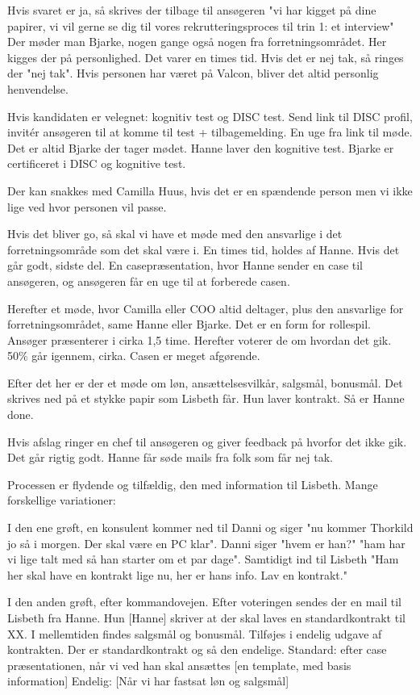 Hvis svaret er ja, så skrives der tilbage til ansøgeren "vi har kigget på dine papirer, vi vil gerne se dig til vores rekrutteringsproces til trin 1: et interview" Der møder man Bjarke, nogen gange også nogen fra forretningsområdet.
Her kigges der på personlighed. Det varer en times tid.
Hvis det er nej tak, så ringes der "nej tak". Hvis personen har været på Valcon, bliver det altid personlig henvendelse.

Hvis kandidaten er velegnet: kognitiv test og DISC test. Send link til DISC profil, invitér ansøgeren til at komme til test + tilbagemelding.
En uge fra link til møde. Det er altid Bjarke der tager mødet. Hanne laver den kognitive test. Bjarke er certificeret i DISC og kognitive test.

Der kan snakkes med Camilla Huus, hvis det er en spændende person men vi ikke lige ved hvor personen vil passe. 

Hvis det bliver go, så skal vi have et møde med den ansvarlige i det forretningsområde som det skal være i. En times tid, holdes af Hanne.
Hvis det går godt, sidste del. En casepræsentation, hvor Hanne sender en case til ansøgeren, og ansøgeren får en uge til at forberede casen.

Herefter et møde, hvor Camilla eller COO altid deltager, plus den ansvarlige for forretningsområdet, same Hanne eller Bjarke. Det er en form for rollespil.
Ansøger præsenterer i cirka 1,5 time. 
Herefter voterer de om hvordan det gik. 50\% går igennem, cirka. Casen er meget afgørende.

Efter det her er der et møde om løn, ansættelsesvilkår, salgsmål, bonusmål. Det skrives ned på et stykke papir som Lisbeth får. Hun laver kontrakt. Så er Hanne done.

Hvis afslag ringer en chef til ansøgeren og giver feedback på hvorfor det ikke gik. Det går rigtig godt. Hanne får søde mails fra folk som får nej tak.


Processen er flydende og tilfældig, den med information til Lisbeth. 
Mange forskellige variationer:

I den ene grøft, en konsulent kommer ned til Danni og siger "nu kommer Thorkild jo så i morgen. Der skal være en PC klar". Danni siger "hvem er han?" "ham har vi lige talt med så han starter om et par dage".
Samtidigt ind til Lisbeth "Ham her skal have en kontrakt lige nu, her er hans info. Lav en kontrakt."

I den anden grøft, efter kommandovejen. Efter voteringen sendes der en mail til Lisbeth fra Hanne. Hun [Hanne] skriver at der skal laves en standardkontrakt til XX. I mellemtiden findes salgsmål og bonusmål. Tilføjes i endelig udgave af kontrakten.
Der er standardkontrakt og så den endelige. 
Standard: efter case præsentationen, når vi ved han skal ansættes [en template, med basis information]
Endelig: [Når vi har fastsat løn og salgsmål]

